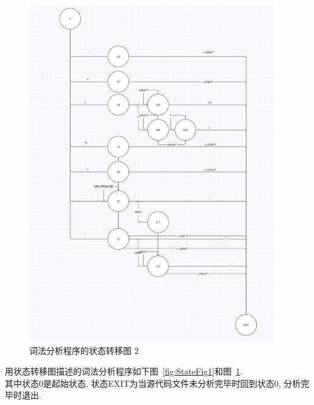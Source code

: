 \begin{figure}
  \begin{center}
    \includegraphics[width=0.95\textwidth]{figures/Page1.png}
  \end{center}
  \caption{词法分析程序的状态转移图 2}
  \label{fig:StateFig2}
\end{figure}
用状态转移图描述的词法分析程序如下图~\ref{fig:StateFig1}和图~\ref{fig:StateFig2}. \\
其中状态0是起始状态, 状态EXIT为当源代码文件未分析完毕时回到状态0, 分析完毕时退出.
